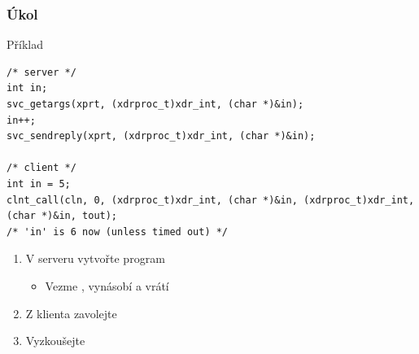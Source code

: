 \begin{frame}[fragile]
  \frametitle{Úkol}

  \begin{block}{Příklad}
\begin{lstlisting}
/* server */
int in;
svc_getargs(xprt, (xdrproc_t)xdr_int, (char *)&in);
in++;
svc_sendreply(xprt, (xdrproc_t)xdr_int, (char *)&in);

/* client */
int in = 5;
clnt_call(cln, 0, (xdrproc_t)xdr_int, (char *)&in, (xdrproc_t)xdr_int, (char *)&in, tout);
/* 'in' is 6 now (unless timed out) */
  \end{lstlisting}
  \end{block}

  \bigskip

  \begin{enumerate}
    \item V serveru vytvořte program
    \begin{itemize}
      \item Vezme , vynásobí  a vrátí 
    \end{itemize}
    \item Z klienta zavolejte
    \item Vyzkoušejte
  \end{enumerate}

\end{frame}


